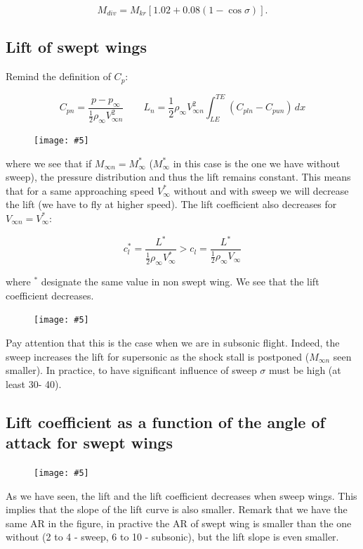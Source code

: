 \documentclass[british,french,11pt, a4paper, openany]{article}
\newcommand{\wrapfig}[6]{%
	\begin{figure}%
		\vspace{-5mm}%
		\texttt{[image: \#5]}%
		\captionof{figure}{}%
		\label{#6}%
	\end{figure}%
}
\begin{document}
\begin{equation}
M_{div} = M_{kr} [1.02 + 0.08 (1-\cos \sigma)].
\end{equation}

\subsection{Lift of swept wings}
Remind the definition of $C_p$: 

\begin{equation}
C_{pn} = \frac{p-p_\infty}{\frac{1}{2} \rho _\infty V_{\infty n} ^2} \qquad L_n = \frac{1}{2}\rho _\infty V_{\infty n} ^2 \int _{LE} ^{TE} (C_{pln} - C_{pun}) \, dx 
\end{equation}

\wrapfig{11}{l}{4.5}{0.12}{ch7/4}{ch7/4}
where we see that if $M_{\infty n} = M_\infty^*$ ($M_\infty^*$ in this case is the one we have without sweep), the pressure distribution and thus the lift remains constant. This means that for a same approaching speed $V_\infty^*$ without and with sweep we will decrease the lift (we have to fly at higher speed). The lift coefficient also decreases for $V_{\infty n} = V_\infty^*$:

\begin{equation}
c_{l}^* = \frac{L^*}{\frac{1}{2}\rho _\infty V_{\infty}^*} > c_{l} = \frac{L^*}{\frac{1}{2}\rho _\infty V_{\infty}}
\end{equation}

where $^*$ designate the same value in non swept wing. We see that the lift coefficient decreases. 

\wrapfig{5}{l}{6}{0.15}{ch7/5}{ch7/5}
Pay attention that this is the case when we are in subsonic flight. Indeed, the sweep increases the lift for supersonic as the shock stall is postponed ($M_{\infty n}$ seen smaller). In practice, to have significant influence of sweep $\sigma$ must be high (at least 30\degres - 40\degres). 

\subsection{Lift coefficient as a function of the angle of attack for swept wings}	
\wrapfig{8}{r}{6}{0.15}{ch7/6}{ch7/6}
As we have seen, the lift and the lift coefficient decreases when sweep wings. This implies that the slope of the lift curve is also smaller. Remark that we have the same AR in the figure, in practive the AR of swept wing is smaller than the one without (2 to 4 - sweep, 6 to 10 - subsonic), but the lift slope is even smaller. 
\end{document}
